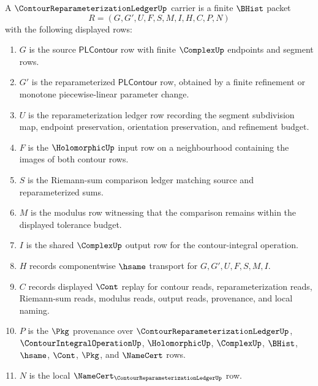 \begin{definition}
\label{def:contour-reparameterization-ledger-carrier}
A $\ContourReparameterizationLedgerUp$ carrier is a finite $\BHist$ packet
$$
R=(G,G',U,F,S,M,I,H,C,P,N)
$$
with the following displayed rows:
\begin{enumerate}
\item $G$ is the source $\mathsf{PLContour}$ row with finite $\ComplexUp$ endpoints and segment rows.
\item $G'$ is the reparameterized $\mathsf{PLContour}$ row, obtained by a finite refinement or monotone piecewise-linear parameter change.
\item $U$ is the reparameterization ledger row recording the segment subdivision map, endpoint preservation, orientation preservation, and refinement budget.
\item $F$ is the $\HolomorphicUp$ input row on a neighbourhood containing the images of both contour rows.
\item $S$ is the Riemann-sum comparison ledger matching source and reparameterized sums.
\item $M$ is the modulus row witnessing that the comparison remains within the displayed tolerance budget.
\item $I$ is the shared $\ComplexUp$ output row for the contour-integral operation.
\item $H$ records componentwise $\hsame$ transport for $G,G',U,F,S,M,I$.
\item $C$ records displayed $\Cont$ replay for contour reads, reparameterization reads, Riemann-sum reads, modulus reads, output reads, provenance, and local naming.
\item $P$ is the $\Pkg$ provenance over $\ContourReparameterizationLedgerUp$, $\ContourIntegralOperationUp$, $\HolomorphicUp$, $\ComplexUp$, $\BHist$, $\hsame$, $\Cont$, $\Pkg$, and $\NameCert$ rows.
\item $N$ is the local $\NameCert_{\ContourReparameterizationLedgerUp}$ row.
\end{enumerate}
\end{definition}

